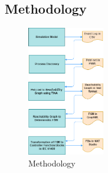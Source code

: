 \begin{bibunit}

 
\section{Methodology}
\label{sec:methodology}

\begin{figure}[!t]
	\centering
	\includegraphics[width=0.3\textwidth]{MX_Papers/Paper6/images/PN2ControllerFlow.png}
	\caption{Methodology}
	\label{Methodology}
\end{figure}


\end{bibunit}
